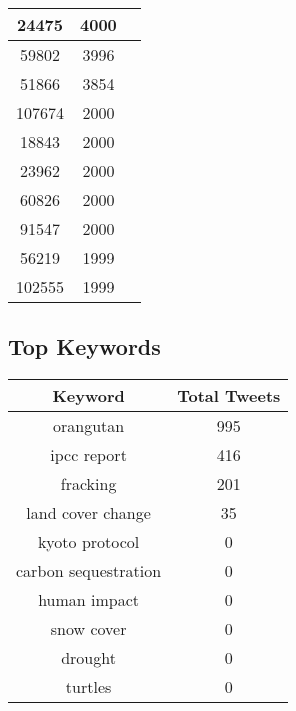 \documentclass{article}\usepackage[T1]{fontenc}
\begin{document}
\begin{tabular}{|c|c|c|}
 \hline
24475 & 4000\\ 
 \hline
59802 & 3996\\ 
 \hline
51866 & 3854\\ 
 \hline
107674 & 2000\\ 
 \hline
18843 & 2000\\ 
 \hline
23962 & 2000\\ 
 \hline
60826 & 2000\\ 
 \hline
91547 & 2000\\ 
 \hline
56219 & 1999\\ 
 \hline
102555 & 1999\\ 
 \hline
\end{tabular}\subsection*{Top Keywords}\begin{tabular}{|c|c|}         \hline         Keyword & Total Tweets \\ 
 \hline
orangutan & 995\\ 
 \hline
ipcc report & 416\\ 
 \hline
fracking & 201\\ 
 \hline
land cover change & 35\\ 
 \hline
kyoto protocol & 0\\ 
 \hline
carbon sequestration & 0\\ 
 \hline
human impact & 0\\ 
 \hline
snow cover & 0\\ 
 \hline
drought & 0\\ 
 \hline
turtles & 0\\ 
 \hline
\end{tabular}
\end{document}
